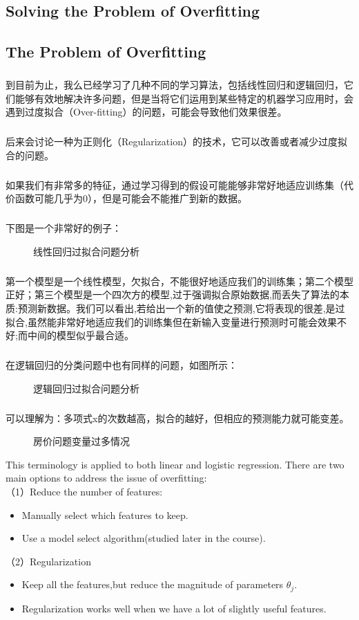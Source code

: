 \documentclass{article}
\begin{document}
\begin{CJK}{UTF8}{gbsn}
\section{Solving the Problem of Overfitting}
\subsection{The Problem of Overfitting}
\subparagraph{}
到目前为止，我么已经学习了几种不同的学习算法，包括线性回归和逻辑回归，它们能够有效地解决许多问题，但是当将它们运用到某些特定的机器学习应用时，会遇到过度拟合（Over-fitting）的问题，可能会导致他们效果很差。
\subparagraph{}
后来会讨论一种为正则化（Regularization）的技术，它可以改善或者减少过度拟合的问题。
\subparagraph{}
如果我们有非常多的特征，通过学习得到的假设可能能够非常好地适应训练集（代价函数可能几乎为0），但是可能会不能推广到新的数据。
\subparagraph{}
下图是一个非常好的例子：
\begin{figure}[H]
\caption{线性回归过拟合问题分析}
\label{fig:339}
\end{figure}
\subparagraph{}
第一个模型是一个线性模型，欠拟合，不能很好地适应我们的训练集；第二个模型正好；第三个模型是一个四次方的模型,过于强调拟合原始数据,而丢失了算法的本质:预测新数据。我们可以看出,若给出一个新的值使之预测,它将表现的很差,是过拟合,虽然能非常好地适应我们的训练集但在新输入变量进行预测时可能会效果不好;而中间的模型似乎最合适。
\subparagraph{}
在逻辑回归的分类问题中也有同样的问题，如图所示：
\begin{figure}[H]
\caption{逻辑回归过拟合问题分析}
\label{fig:340}
\end{figure}
\subparagraph{}
可以理解为：多项式x的次数越高，拟合的越好，但相应的预测能力就可能变差。
\begin{figure}[H]
\caption{房价问题变量过多情况}
\label{fig:341}
\end{figure}
This terminology is applied to both linear and logistic regression. There are two main options to address the issue of overfitting:\\
（1）Reduce the number of features:
\begin{itemize}
\item Manually select which features to keep.
\item Use a model select algorithm(studied later in the course).
\end{itemize}
（2）Regularization
\begin{itemize}
\item Keep all the features,but reduce the magnitude of parameters $\theta_j$.
\item Regularization works well when we have a lot of slightly useful features.
\end{itemize}

\end{CJK}
\end{document}
